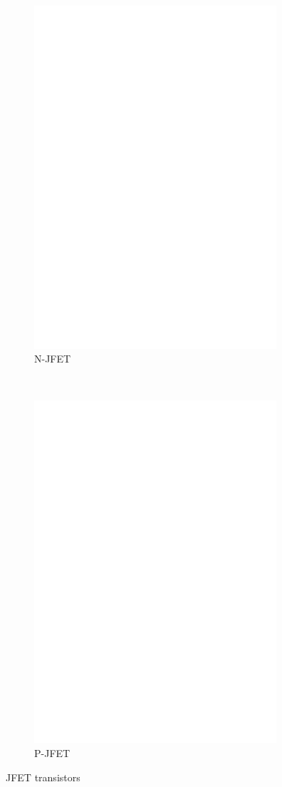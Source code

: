 \begin{figure}[H]
  \begin{subfigure}[b]{9cm}
    \centering
    \includegraphics[width=9cm]{../FIG/JFET_BF245.eps}
    \caption{N-JFET}
    \label{fig:N-JFET}
  \end{subfigure}
  ~
  \begin{subfigure}[b]{9cm}
    \centering
    \includegraphics[width=9cm]{../FIG/JFET_J175.eps}
    \caption{P-JFET}
    \label{fig:P-JFET}
  \end{subfigure}
  \caption{JFET transistors}
\end{figure}




